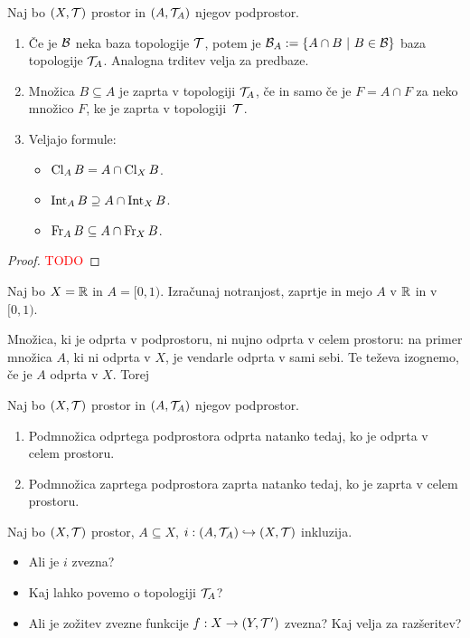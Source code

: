 \begin{trditev}
    Naj bo $(X, \mathcal{T})$ prostor in $(A, \mathcal{T}_A)$ njegov podprostor.
    \begin{enumerate}
        \item Če je $\mathcal{B}$ neka baza topologije $\mathcal{T}$, potem je $\mathcal{B}_A := \left\{A \cap B \ | \ B \in \mathcal{B}\right\}$ baza topologije $\mathcal{T}_A$. Analogna trditev velja za predbaze.
        \item Množica $B \subseteq A$ je zaprta v topologiji $\mathcal{T}_A$, če in samo če je $F = A \cap F$ za neko množico $F$, ke je zaprta v topologiji~$\mathcal{T}$.
        \item Veljajo formule:
        \begin{itemize}
            \item $\operatorname{Cl}_A B = A \cap \operatorname{Cl}_X B$.
            \item $\operatorname{Int}_A B \supseteq A \cap \operatorname{Int}_X B$.
            \item $\operatorname{Fr}_A B \subseteq A \cap \operatorname{Fr}_X B$.
        \end{itemize}
    \end{enumerate}
    
\end{trditev}

\begin{proof}
    \textcolor{red}{TODO}
\end{proof}

\begin{primer}
    Naj bo $X = \mathbb{R}$ in $A = [0,1)$. Izračunaj notranjost, zaprtje in mejo $A$ v $\mathbb{R}$ in v $[0, 1)$.
\end{primer}

Množica, ki je odprta v podprostoru, ni nujno odprta v celem prostoru: na primer množica $A$, ki ni odprta v $X$, je vendarle odprta v sami sebi. Te teževa izognemo, če je $A$ odprta v $X$. Torej

\begin{trditev}
    Naj bo $(X, \mathcal{T})$ prostor in $(A, \mathcal{T}_A)$ njegov podprostor.
    \begin{enumerate}
        \item Podmnožica odprtega podprostora odprta natanko tedaj, ko je odprta v celem prostoru.
        \item Podmnožica zaprtega podprostora zaprta natanko tedaj, ko je zaprta v celem prostoru.
    \end{enumerate}
\end{trditev}

\begin{primer}
    Naj bo $(X, \mathcal{T})$ prostor, $A \subseteq X$, $i: (A, \mathcal{T}_A) \hookrightarrow (X, \mathcal{T})$ inkluzija.
    \begin{itemize}
        \item Ali je $i$ zvezna?
        \item Kaj lahko povemo o topologiji $\mathcal{T}_A$?
        \item Ali je zožitev zvezne funkcije $f: X \to (Y, \mathcal{T}')$ zvezna? Kaj velja za razšeritev?
    \end{itemize}
\end{primer}

